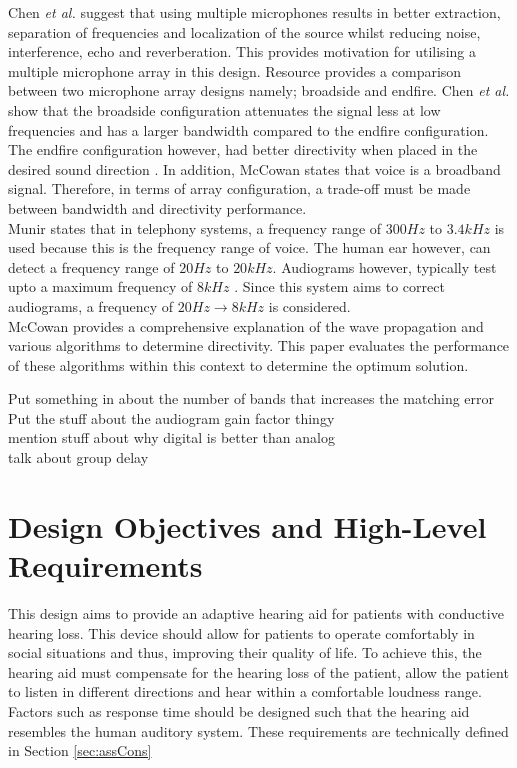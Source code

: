 \documentclass[11pt,onecolumn]{witseiepaper}
\begin{document}
\newline
\noindent Chen \textit{et al.} \cite{present} suggest that using multiple microphones results in better extraction, separation of frequencies and localization of the source whilst reducing noise, interference, echo and reverberation. This provides motivation for utilising a multiple microphone array in this design. Resource \cite{broadEnd} provides a comparison between two microphone array designs namely; broadside and endfire. Chen \textit{et al.} show that the broadside configuration attenuates the signal less at low frequencies and has a larger bandwidth compared to the endfire configuration. The endfire configuration however, had better directivity when placed in the desired sound direction \cite{broadEnd}. In addition, McCowan \cite{mccowan} states that voice is a broadband signal. Therefore, in terms of array configuration, a trade-off must be made between bandwidth and directivity performance.  \\
\newline
\noindent Munir \cite{munir} states that in telephony systems, a frequency range of $300Hz$ to $3.4kHz$ is used because this is the frequency range of voice. The human ear however, can detect a frequency range of $20Hz$ to $20kHz$. Audiograms however, typically test upto a maximum frequency of $8kHz$ \cite{audioMaxFreq}. Since this system aims to correct audiograms, a frequency of $20Hz \rightarrow 8kHz$ is considered.\\
\newline
\noindent McCowan \cite{mccowan} provides a comprehensive explanation of the wave propagation and various algorithms to determine directivity. This paper evaluates the performance of these algorithms within this context to determine the optimum solution.\\
\newline

Put something in about the number of bands that increases the matching error
Put the stuff about the audiogram gain factor thingy\\
mention stuff about why digital is better than analog\\
talk about group delay\\
\section{Design Objectives and High-Level Requirements}

\noindent This design aims to provide an adaptive hearing aid for patients with conductive hearing loss. This device should allow for patients to operate comfortably in social situations and thus, improving their quality of life. To achieve this, the hearing aid must compensate for the hearing loss of the patient, allow the patient to listen in different directions and hear within a comfortable loudness range. Factors such as response time should be designed such that the hearing aid resembles the human auditory system. These requirements are technically defined in Section \ref{sec:assCons}
\end{document}
